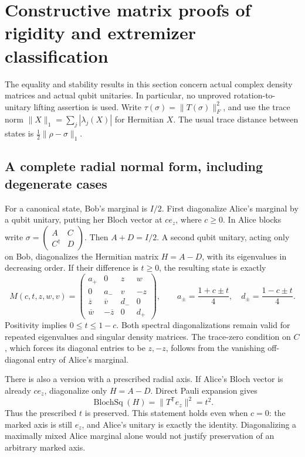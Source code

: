 \section{Constructive matrix proofs of rigidity and extremizer classification}
\label{sec:matrix-rigidity}

The equality and stability results in this section concern actual complex
density matrices and actual qubit unitaries.  In particular, no unproved
rotation-to-unitary lifting assertion is used.  Write
\(\tau(\sigma)=\|T(\sigma)\|_F^2\), and use the trace norm
\(\|X\|_1=\sum_j|\lambda_j(X)|\) for Hermitian \(X\).
The usual trace distance between states is \(\frac12\|\rho-\sigma\|_1\).

\subsection{A complete radial normal form, including degenerate cases}

For a canonical state, Bob's marginal is \(I/2\).  First diagonalize Alice's
marginal by a qubit unitary, putting her Bloch vector at \(c e_z\), where
\(c\geq0\).  In Alice blocks write
\(\sigma=\left(\begin{smallmatrix}A&C\\C^\dagger&D\end{smallmatrix}\right)\).
Then \(A+D=I/2\).  A second qubit unitary, acting only on Bob, diagonalizes
the Hermitian matrix \(H=A-D\), with its eigenvalues in decreasing order.
If their difference is \(t\geq0\), the resulting state is exactly
\begin{equation}
 M(c,t,z,w,v)=
 \begin{pmatrix}
 a_+&0&z&w\\
 0&a_-&v&-z\\
 \overline z&\overline v&d_-&0\\
 \overline w&-\overline z&0&d_+
 \end{pmatrix},\qquad
 a_\pm=\frac{1+c\pm t}{4},\quad
 d_\pm=\frac{1-c\pm t}{4}.
 \label{eq:rigidity-normal-form}
\end{equation}
Positivity implies \(0\leq t\leq1-c\).  Both spectral diagonalizations
remain valid for repeated eigenvalues and singular density matrices.
The trace-zero condition on \(C\), which forces its diagonal entries to
be \(z,-z\), follows from the vanishing off-diagonal entry of Alice's
marginal.

There is also a version with a prescribed radial axis.  If Alice's Bloch
vector is already \(c e_z\), diagonalize only \(H=A-D\).  Direct Pauli
expansion gives
\begin{equation}
 \operatorname{BlochSq}(H)=\|T^{\mathsf T}e_z\|^2=t^2.
\end{equation}
Thus the prescribed \(t\) is preserved.  This statement holds even when
\(c=0\): the marked axis is still \(e_z\), and Alice's unitary is exactly
the identity.  Diagonalizing a maximally mixed Alice marginal alone would
not justify preservation of an arbitrary marked axis.

